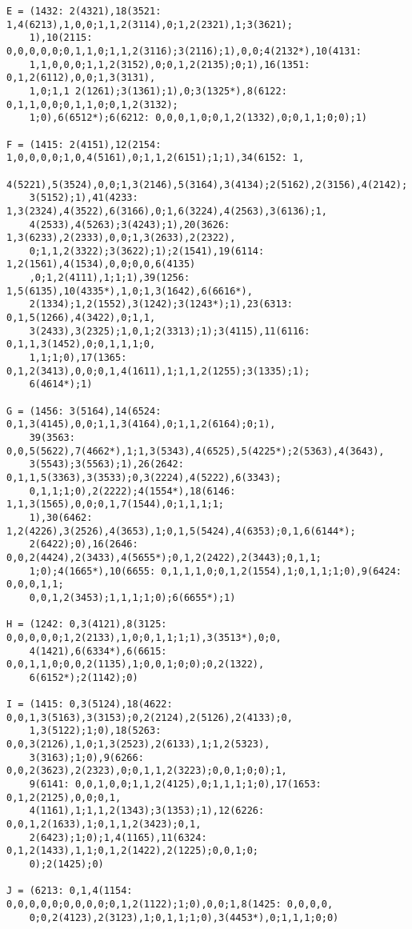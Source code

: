 \begin{verbatim}
E = (1432: 2(4321),18(3521: 1,4(6213),1,0,0;1,1,2(3114),0;1,2(2321),1;3(3621);
    1),10(2115: 0,0,0,0,0;0,1,1,0;1,1,2(3116);3(2116);1),0,0;4(2132*),10(4131:
    1,1,0,0,0;1,1,2(3152),0;0,1,2(2135);0;1),16(1351: 0,1,2(6112),0,0;1,3(3131),
    1,0;1,1 2(1261);3(1361);1),0;3(1325*),8(6122: 0,1,1,0,0;0,1,1,0;0,1,2(3132);
    1;0),6(6512*);6(6212: 0,0,0,1,0;0,1,2(1332),0;0,1,1;0;0);1)

F = (1415: 2(4151),12(2154: 1,0,0,0,0;1,0,4(5161),0;1,1,2(6151);1;1),34(6152: 1,
    4(5221),5(3524),0,0;1,3(2146),5(3164),3(4134);2(5162),2(3156),4(2142);
    3(5152);1),41(4233: 1,3(2324),4(3522),6(3166),0;1,6(3224),4(2563),3(6136);1,
    4(2533),4(5263);3(4243);1),20(3626: 1,3(6233),2(2333),0,0;1,3(2633),2(2322),
    0;1,1,2(3322);3(3622);1);2(1541),19(6114: 1,2(1561),4(1534),0,0;0,0,6(4135)
    ,0;1,2(4111),1;1;1),39(1256: 1,5(6135),10(4335*),1,0;1,3(1642),6(6616*),
    2(1334);1,2(1552),3(1242);3(1243*);1),23(6313: 0,1,5(1266),4(3422),0;1,1,
    3(2433),3(2325);1,0,1;2(3313);1);3(4115),11(6116: 0,1,1,3(1452),0;0,1,1,1;0,
    1,1;1;0),17(1365: 0,1,2(3413),0,0;0,1,4(1611),1;1,1,2(1255);3(1335);1);
    6(4614*);1)

G = (1456: 3(5164),14(6524: 0,1,3(4145),0,0;1,1,3(4164),0;1,1,2(6164);0;1),
    39(3563: 0,0,5(5622),7(4662*),1;1,3(5343),4(6525),5(4225*);2(5363),4(3643),
    3(5543);3(5563);1),26(2642: 0,1,1,5(3363),3(3533);0,3(2224),4(5222),6(3343);
    0,1,1;1;0),2(2222);4(1554*),18(6146: 1,1,3(1565),0,0;0,1,7(1544),0;1,1,1;1;
    1),30(6462: 1,2(4226),3(2526),4(3653),1;0,1,5(5424),4(6353);0,1,6(6144*);
    2(6422);0),16(2646: 0,0,2(4424),2(3433),4(5655*);0,1,2(2422),2(3443);0,1,1;
    1;0);4(1665*),10(6655: 0,1,1,1,0;0,1,2(1554),1;0,1,1;1;0),9(6424: 0,0,0,1,1;
    0,0,1,2(3453);1,1,1;1;0);6(6655*);1)

H = (1242: 0,3(4121),8(3125: 0,0,0,0,0;1,2(2133),1,0;0,1,1;1;1),3(3513*),0;0,
    4(1421),6(6334*),6(6615: 0,0,1,1,0;0,0,2(1135),1;0,0,1;0;0);0,2(1322),
    6(6152*);2(1142);0)

I = (1415: 0,3(5124),18(4622: 0,0,1,3(5163),3(3153);0,2(2124),2(5126),2(4133);0,
    1,3(5122);1;0),18(5263: 0,0,3(2126),1,0;1,3(2523),2(6133),1;1,2(5323),
    3(3163);1;0),9(6266: 0,0,2(3623),2(2323),0;0,1,1,2(3223);0,0,1;0;0);1,
    9(6141: 0,0,1,0,0;1,1,2(4125),0;1,1,1;1;0),17(1653: 0,1,2(2125),0,0;0,1,
    4(1161),1;1,1,2(1343);3(1353);1),12(6226: 0,0,1,2(1633),1;0,1,1,2(3423);0,1,
    2(6423);1;0);1,4(1165),11(6324: 0,1,2(1433),1,1;0,1,2(1422),2(1225);0,0,1;0;
    0);2(1425);0)

J = (6213: 0,1,4(1154: 0,0,0,0,0;0,0,0,0;0,1,2(1122);1;0),0,0;1,8(1425: 0,0,0,0,
    0;0,2(4123),2(3123),1;0,1,1;1;0),3(4453*),0;1,1,1;0;0)
\end{verbatim}
\normalsize


